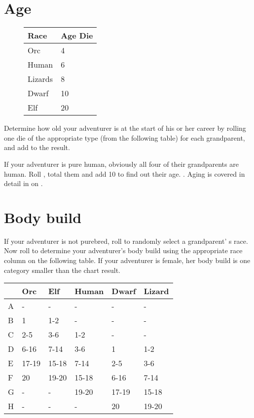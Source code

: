 \begin{multicols*}{2}
\section{Age}
\begin{wrapfigure}[8]{o}[0pt]{3.25cm}
\begin{normbox}
\small
{}
\begin{tabular}{l l}
\textbf{Race} & \textbf{Age Die}\\
\midrule
Orc & 4\\
Human & 6\\
Lizards &  8\\
Dwarf & 10\\
Elf &  20\\
\end{tabular}
\normalsize
\end{normbox}
\end{wrapfigure}
Determine how old your adventurer is at the start of his or her career by rolling one die of the appropriate type (from the following table) for each grandparent, and add  to the result.

If your adventurer is pure human, obviously all four of their grandparents are human. Roll , total them and add 10 to find out their age. . Aging is covered in detail in  on .
\section{Body build}
If your adventurer is not purebred, roll  to randomly select a grandparent' s race. Now roll  to determine your adventurer's body build using the appropriate race column on the following table. If your adventurer is female, her body build is one category smaller than the chart result.

\begin{normbox}
\indx{}
\small
\begin{tabular}{@{} l l l l l l }
 & Orc & Elf & Human & Dwarf & Lizard\\
\midrule
A & - & - & - & - & -\\
B & 1 & 1-2 & - & - & -\\
C & 2-5 & 3-6 & 1-2 & - & -\\
D & 6-16 & 7-14 & 3-6 & 1 & 1-2\\
E & 17-19 & 15-18 & 7-14 & 2-5 & 3-6\\
F & 20 & 19-20 & 15-18 & 6-16 & 7-14\\
G & - & - & 19-20 & 17-19 & 15-18\\
H & - & - & - & 20 & 19-20\\
\end{tabular}
\end{normbox}
\vfill\null
{}


\end{multicols*}
